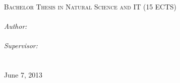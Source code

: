 \documentclass[11pt, a4paper, oneside]{Thesis} %
\title{\ttitle} %
\begin{document}
\frontmatter %


\fancyhead{} %
\rhead{\thepage} %
\lhead{} %

\pagestyle{fancy} %

\newcommand{\HRule}{\rule{\linewidth}{0.5mm}} %

\hypersetup{pdfsubject=\subjectname}
\hypersetup{pdfauthor=\authornames}
\hypersetup{pdfkeywords=\keywordnames}



\begin{titlepage}

%                          
% 
\vspace*{5cm}
\textsc{\Large Bachelor Thesis in Natural Science and IT (15 ECTS)}\\[0.5cm] %

{\huge \bfseries \ttitle}\\[1cm] %
\large
\emph{Author:}\\
{\authornames}\\[0.5cm] %
\emph{Supervisor:} \\
{\supname}\\[9cm] %

\deptname\\ %
{\large June 7, 2013} %
 
\vfill

\end{titlepage}
\end{document}
